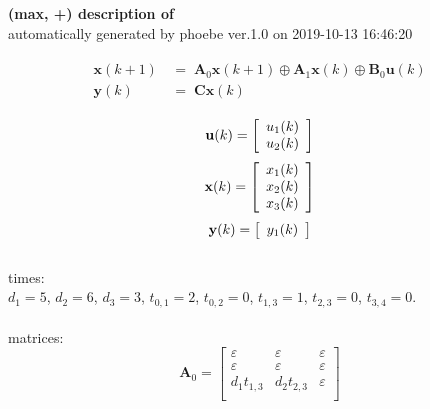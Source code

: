 \documentclass[11pt, a4paper, fleqn]{article}
\begin{document}
\noindent
\textbf{(max, +) description of} \texttt{\currfilebase} \\
automatically generated by phoebe ver.1.0 on 2019-10-13 16:46:20 

\begin{align}\begin{split}
\mathbf{x}(k+1) & \, = \; \mathbf{A}_{0}\mathbf{x}(k+1) \oplus \mathbf{A}_{1}\mathbf{x}(k) \oplus \mathbf{B}_{0}\mathbf{u}(k)\\
\mathbf{y}(k) & \, = \; \mathbf{Cx}(k)
\end{split}\end{align}

\begin{equation*}
\mathbf{u}(k) = 
\left[\begin{array}{*{20}c}
  u_1(k) \\
  u_2(k) \\
\end{array}\right]
\end{equation*}
\begin{equation*}
\mathbf{x}(k) = 
\left[\begin{array}{*{20}c}
  x_1(k) \\
  x_2(k) \\
  x_3(k) \\
\end{array}\right]
\end{equation*}
\begin{equation*}
\mathbf{y}(k) = 
\left[\begin{array}{*{20}c}
  y_1(k) \\
\end{array}\right]
\end{equation*}
\noindent\\
times:\\
$d_1 = 5$, $d_2 = 6$, $d_3 = 3$, $t_{0,1} = 2$, $t_{0,2} = 0$, $t_{1,3} = 1$, $t_{2,3} = 0$, $t_{3,4} = 0$.\\
\\
matrices:
\begin{equation*}
\mathbf{A}_{0} = 
\left[\begin{array}{ ccc }
\varepsilon	&\varepsilon	&\varepsilon\\
\varepsilon	&\varepsilon	&\varepsilon\\
d_1t_{1,3}	&d_2t_{2,3}	&\varepsilon\\
\end{array}\right]
\end{equation*}
\end{document}
